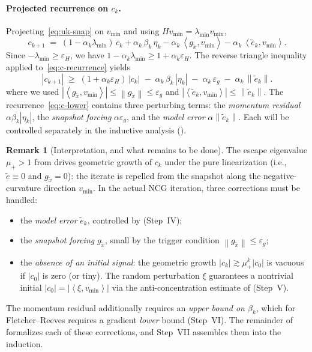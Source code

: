 \documentclass[11pt,a4paper]{article}
\theoremstyle{plain}
\theoremstyle{definition}
\newtheorem{remark}{Remark}
\newcommand{\norm}[1]{\left\|#1\right\|}
\newcommand{\inner}[2]{\left\langle #1,#2 \right\rangle}
\newcommand{\eps}{\varepsilon}
\newcommand{\epsg}{\eps_{g}}
\newcommand{\epsH}{\eps_{H}}
\newcommand{\snap}{\tilde{x}}
\newcommand{\vmin}{v_{\min}}
\newcommand{\lmin}{\lambda_{\min}}
\begin{document}
\paragraph{Projected recurrence on $c_{k}$.}
Projecting~\eqref{eq:uk-snap} on $\vmin$ and using $H\vmin=\lmin\vmin$,
\begin{equation}\label{eq:c-recurrence}
c_{k+1}
\;=\; (1-\alpha_{k}\lmin)\,c_{k} + \alpha_{k}\,\beta_{k}\,\eta_{k}
      - \alpha_{k}\,\inner{g_{\snap}}{\vmin}
      - \alpha_{k}\,\inner{\tilde e_{k}}{\vmin}.
\end{equation}
Since $-\lmin\ge\epsH$, we have $1-\alpha_{k}\lmin\ge1+\alpha_{k}\epsH$. The
reverse triangle inequality applied to~\eqref{eq:c-recurrence} yields
\begin{equation}\label{eq:c-lower}
|c_{k+1}|
\;\ge\; (1+\alpha_{k}\epsH)\,|c_{k}|
\;-\; \alpha_{k}\,\beta_{k}\,|\eta_{k}|
\;-\; \alpha_{k}\,\epsg
\;-\; \alpha_{k}\,\norm{\tilde e_{k}}.
\end{equation}
where we used $|\inner{g_{\snap}}{\vmin}|\le\norm{g_{\snap}}\le\epsg$ and
$|\inner{\tilde e_{k}}{\vmin}|\le\norm{\tilde e_{k}}$.
The recurrence~\eqref{eq:c-lower} contains three perturbing terms: the
\emph{momentum residual} $\alpha\beta_{k}|\eta_{k}|$, the \emph{snapshot
forcing} $\alpha\epsg$, and the \emph{model error} $\alpha\norm{\tilde e_{k}}$.
Each will be controlled separately in the inductive analysis
().

\begin{remark}[Interpretation, and what remains to be done]\label{rem:escape}
The escape eigenvalue $\mu_{+}>1$ from  drives geometric
growth of $c_{k}$ under the pure linearization (i.e., $\tilde e\equiv 0$ and
$g_{\snap}=0$): the iterate is repelled from the snapshot along the
negative-curvature direction $\vmin$. In the actual NCG iteration, three
corrections must be handled:
\begin{itemize}[leftmargin=*]
   \item the \emph{model error} $\tilde e_{k}$, controlled by
      (Step~IV);
   \item the \emph{snapshot forcing} $g_{\snap}$, small by the trigger
     condition $\norm{g_{\snap}}\le\epsg$;
   \item the \emph{absence of an initial signal}: the geometric growth
     $|c_{k}|\gtrsim\mu_{+}^{k}|c_{0}|$ is vacuous if $|c_{0}|$ is zero (or
     tiny). The random perturbation $\xi$ guarantees a nontrivial initial
     $|c_{0}| = |\inner{\xi}{\vmin}|$ via the anti-concentration estimate of
      (Step~V).
\end{itemize}
The momentum residual additionally requires an \emph{upper bound on
$\beta_{k}$}, which for Fletcher--Reeves requires a gradient \emph{lower}
bound (Step~VI). The remainder of  formalizes each of these
corrections, and Step~VII assembles them into the induction.
\end{remark}
\end{document}
